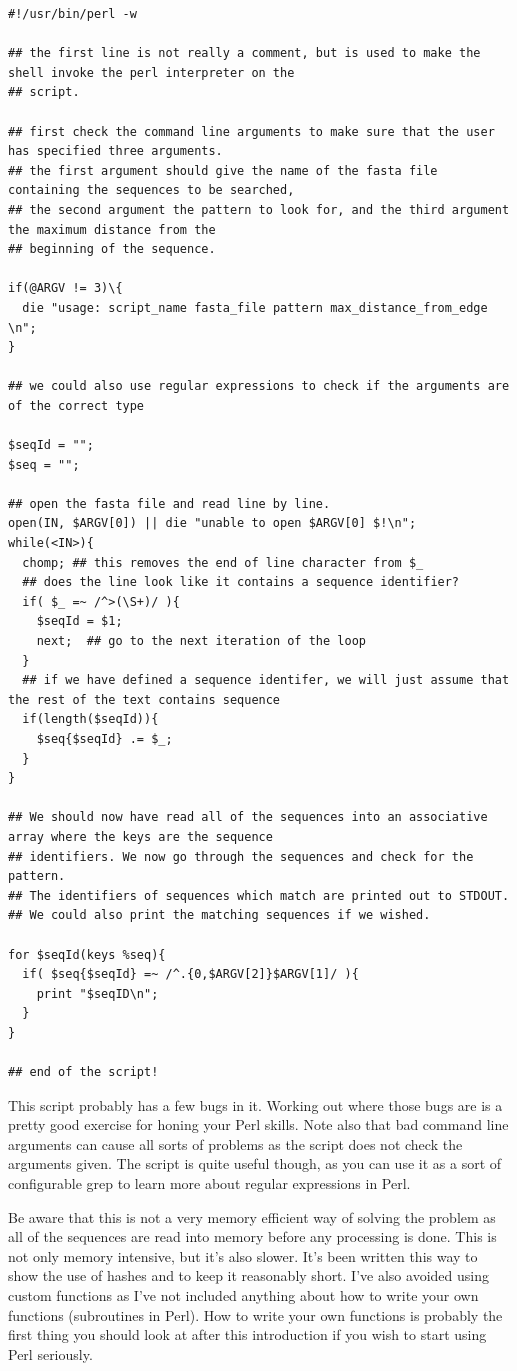\documentclass[11pt]{article}
\begin{document}
\begin{verbatim}
#!/usr/bin/perl -w

## the first line is not really a comment, but is used to make the shell invoke the perl interpreter on the
## script.

## first check the command line arguments to make sure that the user has specified three arguments.
## the first argument should give the name of the fasta file containing the sequences to be searched,
## the second argument the pattern to look for, and the third argument the maximum distance from the
## beginning of the sequence.

if(@ARGV != 3)\{
  die "usage: script_name fasta_file pattern max_distance_from_edge \n";
}

## we could also use regular expressions to check if the arguments are of the correct type

$seqId = "";
$seq = "";

## open the fasta file and read line by line.
open(IN, $ARGV[0]) || die "unable to open $ARGV[0] $!\n";
while(<IN>){
  chomp; ## this removes the end of line character from $_
  ## does the line look like it contains a sequence identifier?
  if( $_ =~ /^>(\S+)/ ){
    $seqId = $1;
    next;  ## go to the next iteration of the loop
  }
  ## if we have defined a sequence identifer, we will just assume that the rest of the text contains sequence
  if(length($seqId)){
    $seq{$seqId} .= $_;
  }
}

## We should now have read all of the sequences into an associative array where the keys are the sequence
## identifiers. We now go through the sequences and check for the pattern.
## The identifiers of sequences which match are printed out to STDOUT.
## We could also print the matching sequences if we wished.

for $seqId(keys %seq){
  if( $seq{$seqId} =~ /^.{0,$ARGV[2]}$ARGV[1]/ ){
    print "$seqID\n";
  }
}

## end of the script!
\end{verbatim}

This script probably has a few bugs in it. Working out where those bugs
are is a pretty good exercise for honing your Perl skills. Note also
that bad command line arguments can cause all sorts of problems as the
script does not check the arguments given. The script is quite useful
though, as you can use it as a sort of configurable grep to learn more
about regular expressions in Perl.

Be aware that this is not a very memory efficient way of solving the
problem as all of the sequences are read into memory before any
processing is done. This is not only memory intensive, but it's also
slower. It's been written this way to show the use of hashes and to keep
it reasonably short. I've also avoided using custom functions as I've
not included anything about how to write your own functions (subroutines
in Perl). How to write your own functions is probably the first thing
you should look at after this introduction if you wish to start using
Perl seriously.
\end{document}
